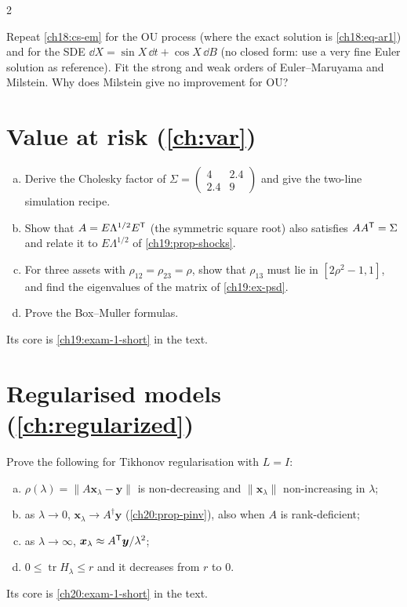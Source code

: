 \begin{paracol}{2}
\begin{exercise}\label{ch18:ex-conv}
Repeat \cref{ch18:cs-em} for the OU process (where the exact solution is \eqref{ch18:eq-ar1}) and for the SDE $\dd X=\sin X\,\dd t+\cos X\,\dd B$ (no closed form: use a very fine Euler solution as reference). Fit the strong and weak orders of Euler--Maruyama and Milstein. Why does Milstein give no improvement for OU?
\end{exercise}

\section{Value at risk (\cref{ch:var})}\label{exam:ch19}

\begin{exercise}\label{ch19:exam-1}
\leavevmode
\begin{enumerate}[(a)]
  \item Derive the Cholesky factor of $\Sigma=\begin{pmatrix}4&2.4\\2.4&9\end{pmatrix}$ and give the two-line simulation recipe.
  \item Show that $A=E\Lambda^{1/2}E^{\mathsf T}$ (the symmetric square root) also satisfies $AA^{\mathsf T}=\Sigma$ and relate it to $E\Lambda^{1/2}$ of \cref{ch19:prop-shocks}.
  \item For three assets with $\rho_{12}=\rho_{23}=\rho$, show that $\rho_{13}$ must lie in $[2\rho^2-1,1]$, and find the eigenvalues of the matrix of \cref{ch19:ex-psd}.
  \item Prove the Box--Muller formulas.
\end{enumerate}
Its core is \cref{ch19:exam-1-short} in the text.
\end{exercise}

\section{Regularised models (\cref{ch:regularized})}\label{exam:ch20}

\begin{exercise}\label{ch20:exam-1}
Prove the following for Tikhonov regularisation with $L=I$:
\begin{enumerate}[(a)]
  \item $\rho(\lambda)=\|A\bm x_\lambda-\bm y\|$ is non-decreasing and $\|\bm x_\lambda\|$ non-increasing in $\lambda$;
  \item as $\lambda\to0$, $\bm x_\lambda\to A^\dagger\bm y$ (\cref{ch20:prop-pinv}), also when $A$ is rank-deficient;
  \item as $\lambda\to\infty$, $\bm x_\lambda\approx A^{\mathsf T}\bm y/\lambda^2$;
  \item $0\le\operatorname{tr}H_\lambda\le r$ and it decreases from $r$ to $0$.
\end{enumerate}
Its core is \cref{ch20:exam-1-short} in the text.
\end{exercise}


\end{paracol}
